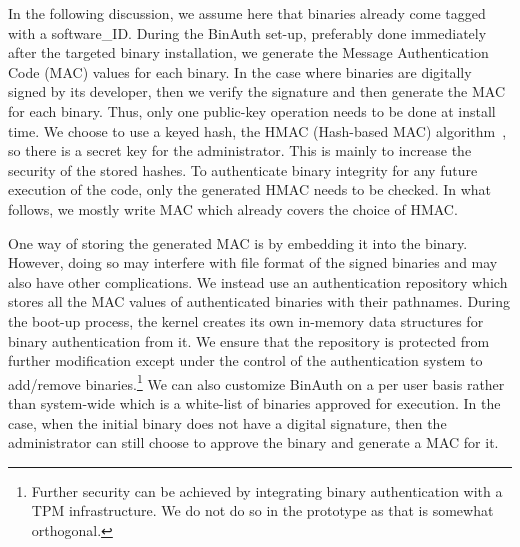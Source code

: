 
In the following discussion, we assume here that binaries already come 
tagged with a software\_ID. 
During the BinAuth set-up, preferably done immediately after 
the targeted binary installation, we generate the Message Authentication Code
(MAC) values for each binary.
In the case where binaries are digitally signed by its developer,
then we verify the signature and then generate the MAC for each binary.
Thus, only one public-key operation needs to be done at install time.
We choose to use a keyed hash, the HMAC (Hash-based MAC)
algorithm~\cite{krawczyk1997rfc2104},
so there is a secret key for the administrator. This is mainly to increase
the security of the stored hashes.
To authenticate binary integrity for any future execution of the code,
only the generated HMAC needs to be checked.
In what follows, we mostly write MAC which already covers the choice of HMAC.

One way of storing the generated MAC is by embedding it into the binary.
However, doing so may interfere with file format of the signed binaries
and may also have other complications. 
We instead use an authentication repository
which stores all the MAC values of authenticated binaries
with their pathnames.
During the boot-up process, the kernel creates its own in-memory data structures
for binary authentication from it.
We ensure that the repository is protected from further modification
except under the control of the authentication system to 
add/remove binaries.\footnote{
Further security can be achieved by integrating binary authentication
with a TPM infrastructure. We do not do so in the prototype as that is
somewhat orthogonal.
}
We can also customize BinAuth on a per user basis rather
than system-wide which is a white-list of
binaries approved for execution.
In the case, when the initial binary does not have a digital signature, then
the administrator can still choose to approve the binary and generate a MAC
for it.

